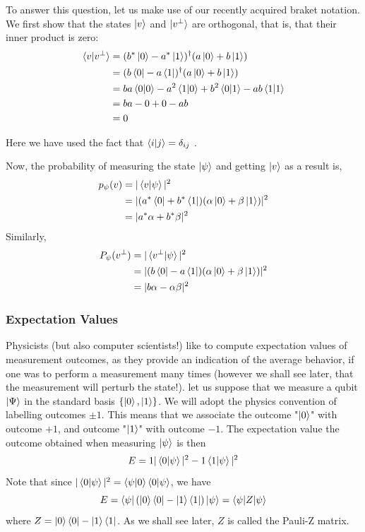 To answer this question, let us make use of our recently acquired braket notation. We first show that the states $\ket{v}$ and $\ket{v^{\perp}}$ are orthogonal, that is, that their inner product is zero:
\begin{align*}
\braket{v|v^{\perp}}&=(b^*\ket{0}-a^*\ket{1})^{\dagger}(a\ket{0}+b\ket{1})\\
&=(b\bra{0}-a\bra{1})^{\dagger}(a\ket{0}+b\ket{1})\\
&=ba\braket{0|0}-a^2\braket{1|0}+b^2\braket{0|1}-ab\braket{1|1}\\
&=ba-0+0-ab\\
&=0
\end{align*}

Here we have used the fact that $\braket{i|j}=\delta_{ij}$ .

Now, the probability of measuring the state $\ket{\psi}$ and getting $\ket{v}$ as a
result is,
\begin{align*}
p_{\psi}(v)&=|\braket{v|\psi}|^2\\
&=|(a^*\bra{0}+b^*\bra{1})(\alpha\ket{0}+\beta\ket{1})|^2\\
&=|a^*\alpha+b^*\beta|^2
\end{align*}
Similarly,
\begin{align*}
P_{\psi}(v^{\perp})&=|\braket{v^{\perp}|\psi}|^2\\
&=|(b\bra{0}-a\bra{1})(\alpha\ket{0}+\beta\ket{1})|^2\\
&=|b\alpha-\alpha\beta|^2
\end{align*}

\subsubsection{Expectation Values}
Physicists (but also computer scientists!) like to compute expectation values of measurement outcomes, as they provide an indication of the average behavior, if one was to perform a measurement many times (however we shall see later, that the measurement will perturb the state!). let us suppose that we measure a qubit $\ket{\Psi}$ in the standard basis $\{\ket{0},\ket{1}\}$. We will adopt the physics convention of labelling outcomes $\pm1$. This means that we associate the outcome "$\ket{0}$" with outcome $+1$, and outcome "$\ket{1}$" with outcome $-1$. The expectation value the outcome obtained when measuring $\ket{\psi}$ is then
\[
E=1|\braket{0|\psi}|^2-1\braket{1|\psi}|^2
\]
Note that since $|\braket{0|\psi}|^2=\braket{\psi|0}\braket{0|\psi}$, we have
\[
E=\bra{\psi}(\ket{0}\bra{0}-\ket{1}\bra{1})\ket{\psi}=\braket{\psi|Z|\psi}
\]
where $Z=\ket{0}\bra{0}-\ket{1}\bra{1}$.  As we shall see later, $Z$ is called the Pauli-Z matrix.

